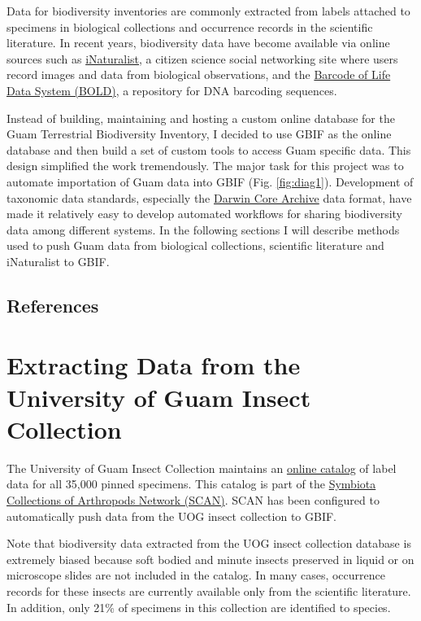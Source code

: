 \documentclass[12pt,letterpaper,english,bibliography=totocnumbered, abstract=on]{scrartcl}
\begin{document}
Data for biodiversity inventories are commonly extracted from labels attached to specimens in biological collections and occurrence records in the scientific literature. In recent years, biodiversity data have become available via online sources such as \href{https://inaturalist.org}{iNaturalist}, a citizen science social networking site where users record images and data from biological observations, and the \href{https://v3.boldsystems.org/}{Barcode of Life Data System (BOLD)}, a repository for DNA barcoding sequences.

Instead of building, maintaining and hosting a custom online database for the Guam Terrestrial Biodiversity Inventory, I decided to use GBIF as the online database and then build a set of custom tools to access Guam specific data. This design simplified the work tremendously. The major task for this project was to automate importation of Guam data into GBIF (Fig. \ref{fig:diag1}). Development of taxonomic data standards, especially the \href{https://www.gbif.org/darwin-core}{Darwin Core Archive} data format, have made it relatively easy to develop automated workflows for sharing biodiversity data among different systems. In the following sections I will describe methods used to push Guam data from biological collections, scientific literature and iNaturalist to GBIF.

\subsection{References}

\printbibliography[heading=none]





\pagebreak
\section{Extracting Data from the University of Guam Insect Collection}

The University of Guam Insect Collection maintains an \href{https://scan-bugs.org/portal/collections/misc/collprofiles.php?collid=180}{online catalog} of label data for all 35,000 pinned specimens. This catalog is part of the \href{https://scan-bugs.org/portal/}{Symbiota Collections of Arthropods Network (SCAN)}. SCAN has been configured to automatically push data from the UOG insect collection to GBIF.

Note that biodiversity data extracted from the UOG insect collection database is extremely biased because soft bodied and minute insects preserved in liquid or on microscope slides are not included in the catalog. In many cases, occurrence records for these insects are currently available only from the scientific literature. In addition, only 21\% of specimens in this collection are identified to species.
\end{document}
